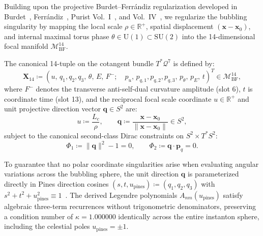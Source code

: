 \documentclass[11pt,a4paper,reqno]{article}
\theoremstyle{plain}
\theoremstyle{definition}
\theoremstyle{remark}
\numberwithin{equation}{section}
\newcommand{\Mbf}{\mathcal{M}_{\mathrm{BF}}^{14}}
\begin{document}
Building upon the projective Burdet--Ferr\'{a}ndiz regularization developed in Burdet~\cite{burdet1969}, Ferr\'{a}ndiz~\cite{ferrandiz1988}, Purist Vol.~I~\cite{PuristVol1Monograph2026}, and Vol.~IV~\cite{RelativisticThreeBody2026}, we regularize the bubbling singularity by mapping the local scale $\rho \in \mathbb{R}^+$, spatial displacement $(\mathbf{x} - \mathbf{x}_0)$, and internal maximal torus phase $\theta \in \mathrm{U}(1) \subset \mathrm{SU}(2)$ into the 14-dimensional focal manifold $\Mbf$.

The canonical 14-tuple on the cotangent bundle $T^*\mathcal{Q}^7$ is defined by:
\begin{equation}
  \bm{X}_{14} \coloneqq \left( u, \, q_1, q_2, q_3, \, \theta, \, E, \, F^-; \quad p_u, \, p_{q,1}, p_{q,2}, p_{q,3}, \, p_\theta, \, p_E, \, t \right)^T \in \Mbf,
  \label{eq:ym_14_tuple}
\end{equation}
where $F^-$ denotes the transverse anti-self-dual curvature amplitude (slot 6), $t$ is coordinate time (slot 13), and the reciprocal focal scale coordinate $u \in \mathbb{R}^+$ and unit projective direction vector $\mathbf{q} \in S^2$ are:
\begin{equation}
  u \coloneqq \frac{L_c}{\rho}, \qquad \mathbf{q} \coloneqq \frac{\mathbf{x} - \mathbf{x}_0}{\|\mathbf{x} - \mathbf{x}_0\|} \in S^2,
  \label{eq:ym_focal_vars}
\end{equation}
subject to the canonical second-class Dirac constraints on $S^2 \times T^*S^2$:
\begin{equation}
  \Phi_1 \coloneqq \|\mathbf{q}\|^2 - 1 = 0, \qquad \Phi_2 \coloneqq \mathbf{q} \cdot \mathbf{p}_q = 0.
  \label{eq:ym_dirac_constraints}
\end{equation}

To guarantee that no polar coordinate singularities arise when evaluating angular variations across the bubbling sphere, the unit direction $\mathbf{q}$ is parameterized directly in Pines direction cosines $(s, t, u_{\mathrm{pines}}) \coloneqq (q_1, q_2, q_3)$ with $s^2 + t^2 + u_{\mathrm{pines}}^2 \equiv 1$~\cite{pines1973}. The derived Legendre polynomials $A_{nm}(u_{\mathrm{pines}})$ satisfy algebraic three-term recurrences without trigonometric denominators, preserving a condition number of $\kappa = 1.000000$ identically across the entire instanton sphere, including the celestial poles $u_{\mathrm{pines}} = \pm 1$.
\end{document}
